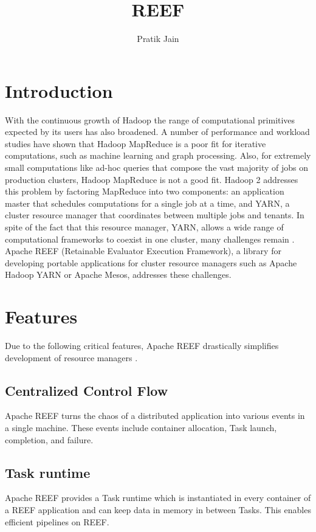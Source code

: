 \documentclass[9pt,twocolumn,twoside]{styles/osajnl}
\title{REEF}
\author{Pratik Jain}
\affil{School of Informatics and Computing, Bloomington, IN 47408, U.S.A.}
\affil{Corresponding authors: jainps@iu.edu}
\begin{document}
\maketitle

\section{Introduction}

With the continuous growth of Hadoop the range of computational primitives expected by its users has also broadened. A number of performance and workload studies have shown that Hadoop MapReduce is a poor fit for iterative computations, such as machine learning and graph processing. Also, for extremely small computations like ad-hoc queries that compose the vast majority of jobs on production clusters, Hadoop MapReduce is not a good fit. Hadoop 2 addresses this problem by factoring MapReduce into two components: an application master that schedules computations for  a  single job  at a  time,  and YARN,  a cluster resource manager that coordinates between multiple jobs  and tenants. In spite of the fact that this resource manager, YARN,  allows a  wide range  of computational frameworks to  coexist in  one cluster, many challenges  remain \cite{reefpaper}. Apache REEF (Retainable Evaluator Execution Framework), a library for developing portable applications for cluster resource managers such as Apache Hadoop YARN or Apache Mesos, addresses these challenges.

\section{Features}

Due to the following critical features, Apache REEF drastically simplifies development of resource managers \cite{reefhome}.

\subsection{Centralized Control Flow} 
Apache REEF turns the chaos of a distributed application into various events in a single machine. These events include container allocation, Task launch, completion, and failure.
\subsection{Task runtime}
Apache REEF provides a Task runtime which is instantiated in every container of a REEF application and can keep data in memory in between Tasks. This enables efficient pipelines on REEF.
\end{document}

